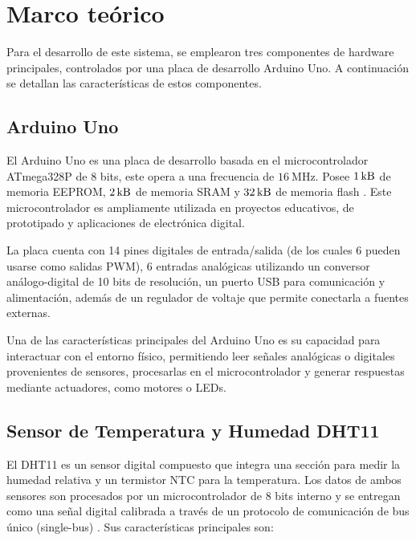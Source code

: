\section{Marco teórico}
Para el desarrollo de este sistema, se emplearon tres componentes de hardware principales, controlados por una placa de desarrollo Arduino Uno. A continuación se detallan las características de estos componentes.
\subsection{Arduino Uno}
El Arduino Uno es una placa de desarrollo basada en el microcontrolador ATmega328P de $8$ bits, este opera a una
frecuencia de $\SI{16}{\mega \hertz}$. Posee $\SI{1}{\kilo \byte}$ de memoria EEPROM, $\SI{2}{\kilo \byte}$ de memoria 
SRAM y $\SI{32}{\kilo \byte}$ de memoria flash \cite{medina-arduino}. Este microcontrolador es ampliamente utilizada en proyectos educativos,
de prototipado y aplicaciones de electrónica digital.


La placa cuenta con 14 pines digitales de entrada/salida 
(de los cuales 6 pueden usarse como salidas PWM),
6 entradas analógicas utilizando un conversor análogo-digital de 10 bits de resolución, 
un puerto USB para comunicación y alimentación, 
además de un regulador de voltaje que permite conectarla a fuentes externas. 


Una de las características principales del Arduino Uno es su capacidad para interactuar con el entorno físico,
permitiendo leer señales analógicas o digitales provenientes de sensores, procesarlas en el microcontrolador 
y generar respuestas mediante actuadores, como motores o LEDs.

\subsection{Sensor de Temperatura y Humedad DHT11}

El DHT11 es un sensor digital compuesto que integra una sección para medir la humedad relativa y un termistor NTC para la temperatura. Los datos de ambos sensores son procesados por un microcontrolador de 8 bits interno y se entregan como una señal digital calibrada a través de un protocolo de comunicación de bus único (single-bus) \cite{dht11}.
Sus características principales son:

